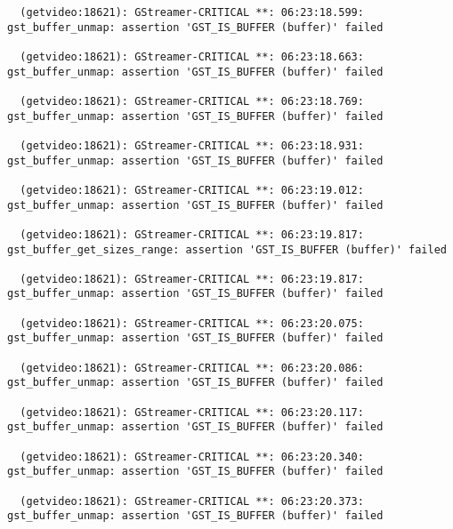 \documentclass[12pt,oneside]{book}
\begin{document}
\begin{lstlisting}
  (getvideo:18621): GStreamer-CRITICAL **: 06:23:18.599: gst_buffer_unmap: assertion 'GST_IS_BUFFER (buffer)' failed

  (getvideo:18621): GStreamer-CRITICAL **: 06:23:18.663: gst_buffer_unmap: assertion 'GST_IS_BUFFER (buffer)' failed

  (getvideo:18621): GStreamer-CRITICAL **: 06:23:18.769: gst_buffer_unmap: assertion 'GST_IS_BUFFER (buffer)' failed

  (getvideo:18621): GStreamer-CRITICAL **: 06:23:18.931: gst_buffer_unmap: assertion 'GST_IS_BUFFER (buffer)' failed

  (getvideo:18621): GStreamer-CRITICAL **: 06:23:19.012: gst_buffer_unmap: assertion 'GST_IS_BUFFER (buffer)' failed

  (getvideo:18621): GStreamer-CRITICAL **: 06:23:19.817: gst_buffer_get_sizes_range: assertion 'GST_IS_BUFFER (buffer)' failed

  (getvideo:18621): GStreamer-CRITICAL **: 06:23:19.817: gst_buffer_unmap: assertion 'GST_IS_BUFFER (buffer)' failed

  (getvideo:18621): GStreamer-CRITICAL **: 06:23:20.075: gst_buffer_unmap: assertion 'GST_IS_BUFFER (buffer)' failed

  (getvideo:18621): GStreamer-CRITICAL **: 06:23:20.086: gst_buffer_unmap: assertion 'GST_IS_BUFFER (buffer)' failed

  (getvideo:18621): GStreamer-CRITICAL **: 06:23:20.117: gst_buffer_unmap: assertion 'GST_IS_BUFFER (buffer)' failed

  (getvideo:18621): GStreamer-CRITICAL **: 06:23:20.340: gst_buffer_unmap: assertion 'GST_IS_BUFFER (buffer)' failed

  (getvideo:18621): GStreamer-CRITICAL **: 06:23:20.373: gst_buffer_unmap: assertion 'GST_IS_BUFFER (buffer)' failed \end{lstlisting}
\end{document}
